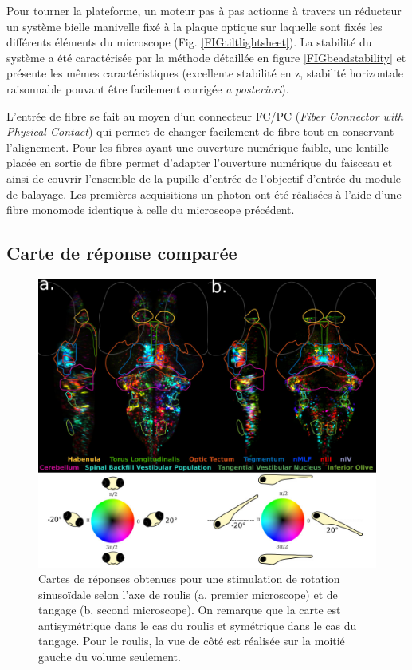 Pour tourner la plateforme, un moteur pas à pas actionne à travers un réducteur un système bielle manivelle fixé à la plaque optique sur laquelle sont fixés les différents éléments du microscope (Fig. \ref{FIGtiltlightsheet}). La stabilité du système a été caractérisée par la méthode détaillée en figure \ref{FIGbeadstability} et présente les mêmes caractéristiques (excellente stabilité en z, stabilité horizontale raisonnable pouvant être facilement corrigée \emph{a posteriori}).

L'entrée de fibre se fait au moyen d'un connecteur FC/PC (\emph{Fiber Connector with Physical Contact}) qui permet de changer facilement de fibre tout en conservant l'alignement. Pour les fibres ayant une ouverture numérique faible, une lentille placée en sortie de fibre permet d'adapter l'ouverture numérique du faisceau et ainsi de couvrir l'ensemble de la pupille d'entrée de l'objectif d'entrée du module de balayage. Les premières acquisitions un photon ont été réalisées à l'aide d'une fibre monomode identique à celle du microscope précédent.

\subsection{Carte de réponse comparée}

\begin{figure}
    \centering
    \includegraphics[width=\textwidth]{./files/tilt_roll.svg.jpg}
    \caption{Cartes de réponses obtenues pour une stimulation de rotation sinusoïdale selon l'axe de roulis (a, premier microscope) et de tangage (b, second microscope). On remarque que la carte est antisymétrique dans le cas du roulis et symétrique dans le cas du tangage.
    Pour le roulis, la vue de côté est réalisée sur la moitié gauche du volume seulement.
    \label{FIGtiltroll}}
    \end{figure}


